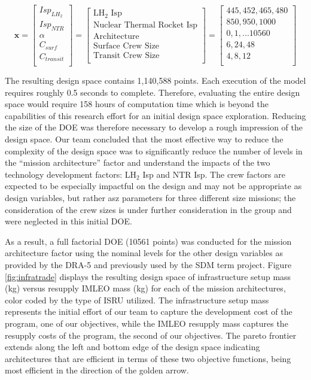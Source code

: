 \documentclass[]{aiaa-pretty}
\begin{document}
\begin{equation*}
\mathbf{x}=
\begin{bmatrix}
Isp_{LH_2}\\
Isp_{NTR}\\
\alpha\\
C_{surf}\\
C_{transit}\\
\end{bmatrix}
=
\begin{bmatrix}
\mbox{LH}_2\mbox{ Isp}\\
\mbox{Nuclear Thermal Rocket Isp}\\
\mbox{Architecture}\\
\mbox{Surface Crew Size}\\
\mbox{Transit Crew Size}\\
\end{bmatrix}
=
\begin{bmatrix}
445,452,465,480\\
850,950,1000\\
0,1,...10560\\
6,24,48\\
4,8,12\\
\end{bmatrix}
\end{equation*}

The resulting design space contains 1,140,588 points. Each execution of the model requires roughly 0.5 seconds to complete. Therefore, evaluating the entire design space would require 158 hours of computation time which is beyond the capabilities of this research effort for an initial design space exploration. Reducing the size of the DOE was therefore necessary to develop a rough impression of the design space. Our team concluded that the most effective way to reduce the complexity of the design space was to significantly reduce the number of levels in the “mission architecture” factor and understand the impacts of the two technology development factors:  LH$_2$ Isp and NTR Isp. The crew factors are expected to be especially impactful on the design and may not be appropriate as design variables, but rather asz parameters for three different size missions; the consideration of the crew sizes is under further consideration in the group and were neglected in this initial DOE. 

As a result, a full factorial DOE (10561 points) was conducted for the mission architecture factor using the nominal levels for the other design variables as provided by the DRA-5 and previously used by the SDM term project. Figure \ref{fig:infratrade} displays the resulting design space of infrastructure setup mass (kg) versus resupply IMLEO mass (kg) for each of the mission architectures, color coded by the type of ISRU utilized. The infrastructure setup mass represents the initial effort of our team to capture the development cost of the program, one of our objectives, while the IMLEO resupply mass captures the resupply costs of the program, the second of our objectives. The pareto frontier extends along the left and bottom edge of the design space indicating architectures that are efficient in terms of these two objective functions, being most efficient in the direction of the golden arrow.
\end{document}
